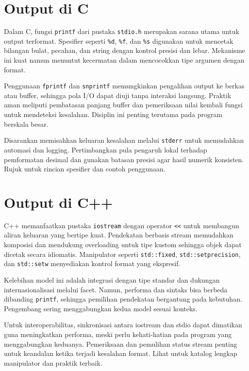 \documentclass[../main.tex]{subfiles}
\begin{document}
\section{Output di C}
Dalam C, fungsi \texttt{printf} dari pustaka \texttt{stdio.h} merupakan sarana utama untuk output terformat. Spesifier seperti \texttt{\%d}, \texttt{\%f}, dan \texttt{\%s} digunakan untuk mencetak bilangan bulat, pecahan, dan string dengan kontrol presisi dan lebar. Mekanisme ini kuat namun menuntut kecermatan dalam mencocokkan tipe argumen dengan format.

Penggunaan \texttt{fprintf} dan \texttt{snprintf} memungkinkan pengalihan output ke berkas atau buffer, sehingga pola I/O dapat diuji tanpa interaksi langsung. Praktik aman meliputi pembatasan panjang buffer dan pemeriksaan nilai kembali fungsi untuk mendeteksi kesalahan. Disiplin ini penting terutama pada program berskala besar.

Disarankan memisahkan keluaran kesalahan melalui \texttt{stderr} untuk memudahkan automasi dan logging. Pertimbangkan pula pengaruh lokal terhadap pemformatan desimal dan gunakan batasan presisi agar hasil numerik konsisten. Rujuk \textcite{k&r-c-output-input,gnu-c-manual} untuk rincian spesifier dan contoh penggunaan.

\section{Output di C++}
C++ memanfaatkan pustaka \texttt{iostream} dengan operator \texttt{<<} untuk membangun aliran keluaran yang bertipe kuat. Pendekatan berbasis stream memudahkan komposisi dan mendukung overloading untuk tipe kustom sehingga objek dapat dicetak secara idiomatis. Manipulator seperti \texttt{std::fixed}, \texttt{std::setprecision}, dan \texttt{std::setw} menyediakan kontrol format yang ekspresif.

Kelebihan model ini adalah integrasi dengan tipe standar dan dukungan internasionalisasi melalui facet. Namun, performa dan sintaks bisa berbeda dibanding \texttt{printf}, sehingga pemilihan pendekatan bergantung pada kebutuhan. Pengembang sering menggabungkan kedua model sesuai konteks.

Untuk interoperabilitas, sinkronisasi antara iostream dan stdio dapat dimatikan guna meningkatkan performa, meski perlu kehati-hatian pada program yang menggabungkan keduanya. Pemeriksaan dan pemulihan status stream penting untuk keandalan ketika terjadi kesalahan format. Lihat \textcite{cplusplus-io,cpp-reference} untuk katalog lengkap manipulator dan praktik terbaik.
\end{document}
